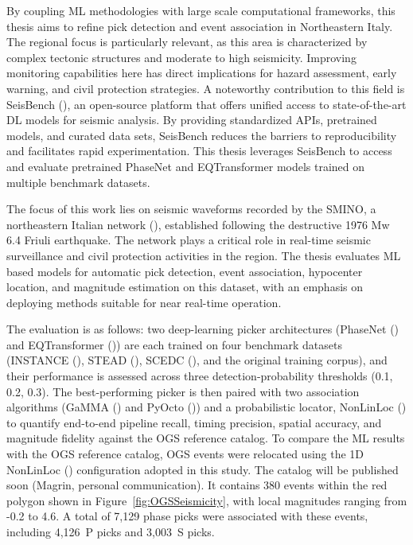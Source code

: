 By coupling \ac{ML} methodologies with large scale computational frameworks,
this thesis aims to refine pick detection and event association in Northeastern
Italy. The regional focus is particularly relevant, as this area is
characterized by complex tectonic structures and moderate to high seismicity.
Improving monitoring capabilities here has direct implications for hazard
assessment, early warning, and civil protection strategies. A noteworthy
contribution to this field is SeisBench (\cite{SeisBench}), an open-source
platform that offers unified access to state-of-the-art \ac{DL} models for
seismic analysis. By providing standardized APIs, pretrained models, and
curated data sets, SeisBench reduces the barriers to reproducibility and
facilitates rapid experimentation. This thesis leverages SeisBench to access
and evaluate pretrained PhaseNet and EQTransformer models trained on multiple
benchmark datasets.

The focus of this work lies on seismic waveforms recorded by the \ac{SMINO}, a
northeastern Italian network (\cite{SMINO}), established following the
destructive 1976 Mw 6.4 Friuli earthquake. The network plays a critical role in
real-time seismic surveillance and civil protection activities in the region.
The thesis evaluates \ac{ML} based models for automatic pick detection, event
association, hypocenter location, and magnitude estimation on this dataset,
with an emphasis on deploying methods suitable for near real-time operation.

The evaluation is as follows: two deep-learning picker architectures (PhaseNet
(\cite{PhaseNet}) and EQTransformer (\cite{EQTransformer})) are each trained on
four benchmark datasets (INSTANCE (\cite{INSTANCE}), STEAD (\cite{STEAD}),
SCEDC (\cite{SCEDC}), and the original training corpus), and their performance
is assessed across three detection-probability thresholds (0.1, 0.2, 0.3). The
best-performing picker is then paired with two association algorithms (GaMMA
(\cite{GaMMA}) and PyOcto (\cite{PyOcto})) and a probabilistic locator,
NonLinLoc (\cite{NonLinLoc}) to quantify end-to-end pipeline recall, timing
precision, spatial accuracy, and magnitude fidelity against the OGS reference
catalog. To compare the ML results with the OGS reference catalog, OGS events
were relocated using the 1D NonLinLoc (\cite{NonLinLoc}) configuration adopted
in this study. The catalog will be published soon (Magrin, personal
communication). It contains 380 events within the red polygon shown in
Figure~\ref{fig:OGSSeismicity}, with local magnitudes ranging from -0.2 to 4.6.
A total of 7,129 phase picks were associated with these events, including
4,126~P picks and 3,003~S picks.

